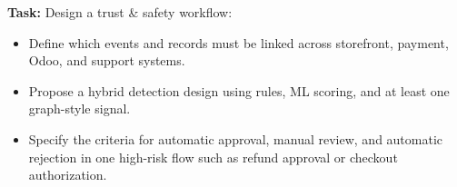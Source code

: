 \textbf{Task:} Design a trust \& safety workflow:
\begin{itemize}
  \item Define which events and records must be linked across storefront, payment, Odoo, and support systems.
  \item Propose a hybrid detection design using rules, ML scoring, and at least one graph-style signal.
  \item Specify the criteria for automatic approval, manual review, and automatic rejection in one high-risk flow such as refund approval or checkout authorization.
\end{itemize}

